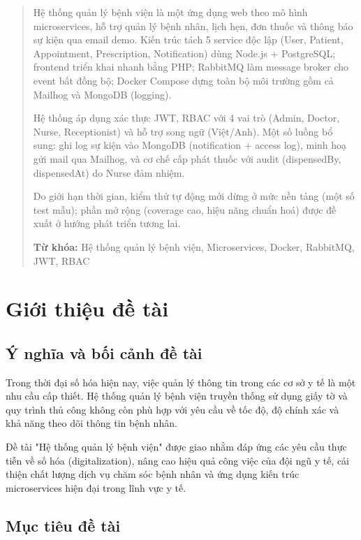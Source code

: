 \documentclass[12pt,a4paper]{report}
\begin{document}
    \newpage
    \begin{abstract}
        \noindent
    Hệ thống quản lý bệnh viện là một ứng dụng web theo mô hình microservices, hỗ trợ quản lý bệnh nhân, lịch hẹn, đơn thuốc và thông báo sự kiện qua email demo. Kiến trúc tách 5 service độc lập (User, Patient, Appointment, Prescription, Notification) dùng Node.js + PostgreSQL; frontend triển khai nhanh bằng PHP; RabbitMQ làm message broker cho event bất đồng bộ; Docker Compose dựng toàn bộ môi trường gồm cả Mailhog và MongoDB (logging).

    Hệ thống áp dụng xác thực JWT, RBAC với 4 vai trò (Admin, Doctor, Nurse, Receptionist) và hỗ trợ song ngữ (Việt/Anh). Một số luồng bổ sung: ghi log sự kiện vào MongoDB (notification + access log), minh hoạ gửi mail qua Mailhog, và cơ chế cấp phát thuốc với audit (dispensedBy, dispensedAt) do Nurse đảm nhiệm.

    Do giới hạn thời gian, kiểm thử tự động mới dừng ở mức nền tảng (một số test mẫu); phần mở rộng (coverage cao, hiệu năng chuẩn hoá) được đề xuất ở hướng phát triển tương lai.

        \textbf{Từ khóa:} Hệ thống quản lý bệnh viện, Microservices, Docker, RabbitMQ, JWT, RBAC
    \end{abstract}

    \tableofcontents
    \newpage

    \chapter{Giới thiệu đề tài}

    \section{Ý nghĩa và bối cảnh đề tài}
    Trong thời đại số hóa hiện nay, việc quản lý thông tin trong các cơ sở y tế là một nhu cầu cấp thiết. Hệ thống quản lý bệnh viện truyền thống sử dụng giấy tờ và quy trình thủ công không còn phù hợp với yêu cầu về tốc độ, độ chính xác và khả năng theo dõi thông tin bệnh nhân.

    Đề tài "Hệ thống quản lý bệnh viện" được giao nhằm đáp ứng các yêu cầu thực tiễn về số hóa (digitalization), nâng cao hiệu quả công việc của đội ngũ y tế, cải thiện chất lượng dịch vụ chăm sóc bệnh nhân và ứng dụng kiến trúc microservices hiện đại trong lĩnh vực y tế.

    \section{Mục tiêu đề tài}
\end{document}
